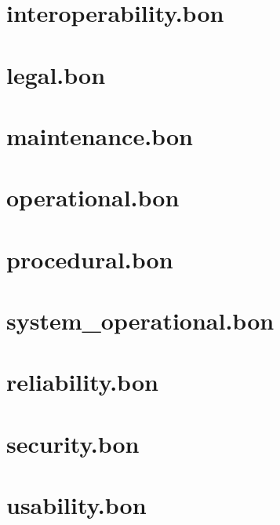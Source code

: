 \section{interoperability.bon}

\section{legal.bon}

\section{maintenance.bon}

\section{operational.bon}

\section{procedural.bon}

\section{system\_operational.bon}

\section{reliability.bon}

\section{security.bon}

\section{usability.bon}

